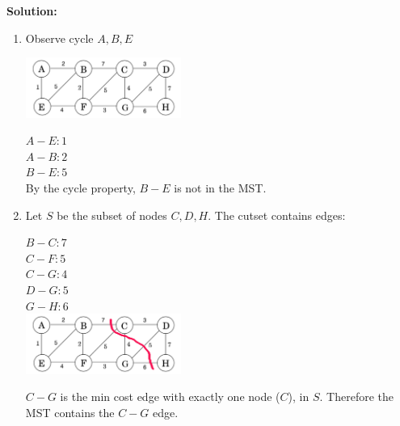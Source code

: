 \documentclass[11pt]{article}
\begin{document}
\begin{enumerate}
{\bf Solution:}\\
\begin{enumerate}
\item
Observe cycle ${A, B, E}$\\
\begin{center}
\includegraphics[width=2in]{copy.png}
\end{center}
\begin{multicols}{2}
$A - E: 1$\\
$A - B: 2$\\
$B - E: 5$\\
\vfill
\columnbreak
By the cycle property, $B - E$ is not in the MST.
\end{multicols}

\item
Let $S$ be the subset of nodes ${C, D, H}$. The cutset contains edges:\\
\begin{multicols}{2}


$B - C: 7$\\
$C - F: 5$\\
$C - G: 4$\\
$D - G: 5$\\
$G - H: 6$\\

\includegraphics[width=2in]{cutset.png}
\end{multicols}
$C - G$ is the min cost edge with exactly one node ($C$), in $S$. Therefore the MST contains the $C - G$ edge.


\end{enumerate}
\end{enumerate}
\end{document}
